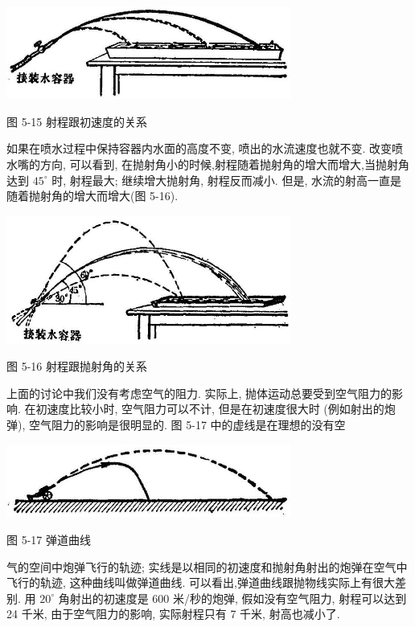 \documentclass[10pt]{article}
\begin{document}
\begin{center}
\includegraphics[max width=0.7\textwidth]{images/01912d55-147c-70aa-b0e0-1782a122f948_139_543236.jpg}
\end{center}

图 5-15 射程跟初速度的关系

如果在喷水过程中保持容器内水面的高度不变, 喷出的水流速度也就不变. 改变喷水嘴的方向, 可以看到, 在抛射角小的时候,射程随着抛射角的增大而增大,当抛射角达到 \({45}^{ \circ }\) 时, 射程最大; 继续增大抛射角, 射程反而减小. 但是, 水流的射高一直是随着抛射角的增大而增大(图 5-16).

\begin{center}
\includegraphics[max width=0.7\textwidth]{images/01912d55-147c-70aa-b0e0-1782a122f948_140_423120.jpg}
\end{center}

图 5-16 射程跟抛射角的关系

上面的讨论中我们没有考虑空气的阻力. 实际上, 抛体运动总要受到空气阻力的影响. 在初速度比较小时, 空气阻力可以不计, 但是在初速度很大时 (例如射出的炮弹), 空气阻力的影响是很明显的. 图 5-17 中的虚线是在理想的没有空

\begin{center}
\includegraphics[max width=0.7\textwidth]{images/01912d55-147c-70aa-b0e0-1782a122f948_140_121023.jpg}
\end{center}

图 5-17 弹道曲线

气的空间中炮弹飞行的轨迹; 实线是以相同的初速度和抛射角射出的炮弹在空气中飞行的轨迹, 这种曲线叫做弹道曲线. 可以看出,弹道曲线跟抛物线实际上有很大差别. 用 \({20}^{ \circ }\) 角射出的初速度是 600 米/秒的炮弹, 假如没有空气阻力, 射程可以达到 24 千米, 由于空气阻力的影响, 实际射程只有 7 千米, 射高也减小了.
\end{document}
